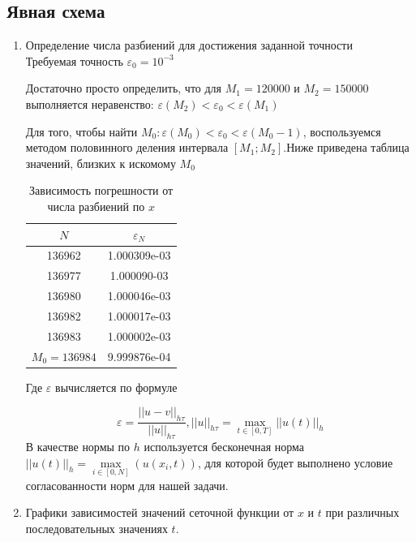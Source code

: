 \documentclass[12pt]{article}
\begin{document}
\subsection{Явная схема}
\begin{enumerate}
\item Определение числа разбиений для достижения заданной точности \\
Требуемая точность $\varepsilon_0 = 10^{-3}$

Достаточно просто определить, что для $M_1 = 120000$ и $M_2 = 150000$ выполняется неравенство: $\varepsilon(M_2) < \varepsilon_0 < \varepsilon(M_1)$

Для того, чтобы найти $M_0: \varepsilon(M_0) < \varepsilon_0 < \varepsilon(M_0 - 1)$, воспользуемся методом половинного деления интервала $[M_1;M_2]$.Ниже приведена таблица значений, близких к искомому $M_0$

\begin{table}[H]
\caption{Зависимость погрешности от числа разбиений по $x$ }
\begin{center}
\begin{tabular}{|c|c|}
\hline
$N$ & $\varepsilon_N$ \\
\hline
136962 & 1.000309e-03 \\
\hline
136977 & 1.000090-03  \\
\hline
136980 & 1.000046e-03 \\
\hline
136982 & 1.000017e-03 \\
\hline
136983 & 1.000002e-03 \\
\hline
$M_0 = 136984$ & 9.999876e-04 \\
\hline
\end{tabular}
\end{center}
\end{table}

Где $\varepsilon$ вычисляется по формуле

$$
\varepsilon = \dfrac{||u -v||_{h\tau}}{||u||_{h\tau}},  ||u||_{h\tau} = \max \limits_{{t\in[0,T]}}||u(t)||_h
$$
В качестве нормы по $h$ используется бесконечная норма $||u(t)||_h = \max \limits_{{i\in[0,N]}}(u(x_i, t))$, 
для которой будет выполнено условие согласованности норм для нашей задачи.

\newpage

\item Графики зависимостей значений сеточной функции от $x$ и $t$ при различных последовательных значениях $t$.


\end{enumerate}
\end{document}
